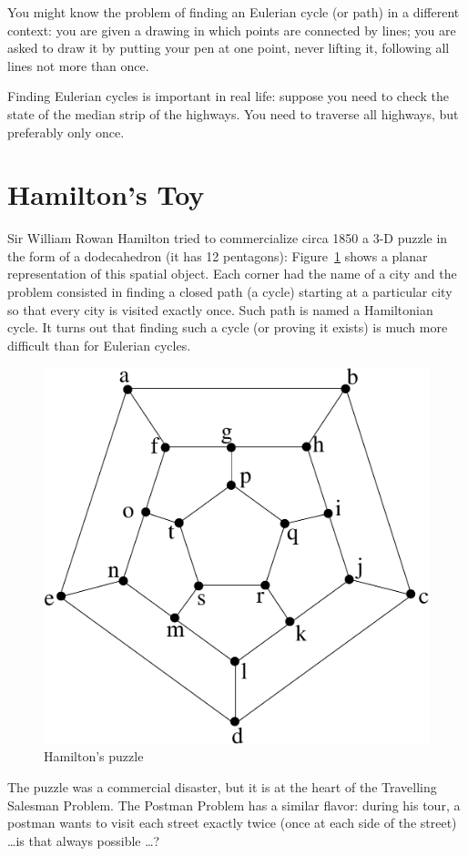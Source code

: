You might know the problem of finding an Eulerian cycle (or path) in a
different context: you are given a drawing in which points are
connected by lines; you are asked to draw it by putting your pen at
one point, never lifting it, following all lines not more than once.

Finding Eulerian cycles is important in real life: suppose you need to
check the state of the median strip of the highways. You need to
traverse all highways, but preferably only once.

\section{Hamilton's Toy}

Sir William Rowan Hamilton tried to commercialize circa 1850 a 3-D
puzzle in the form of a dodecahedron (it has 12 pentagons):
Figure~\ref{hamilton1} shows a planar representation of this spatial
object. Each corner had the name of a city and the problem consisted
in finding a closed path (a cycle) starting at a particular city so
that every city is visited exactly once. Such path is named a
Hamiltonian cycle. It turns out that finding such a cycle (or proving
it exists) is much more difficult than for Eulerian cycles.

\begin{figure}[ht]
\begin{center}
\includegraphics[width=0.4\linewidth,keepaspectratio]{hamilton}
\end{center}
\caption{Hamilton's puzzle
\label{hamilton1}}
\end{figure}

The puzzle was a commercial disaster, but it is at the heart of the
Travelling Salesman Problem.
The Postman Problem has a similar flavor: during his tour, a postman
wants to visit each street exactly twice (once at each side of the
street) \ldots is that always possible \ldots?

